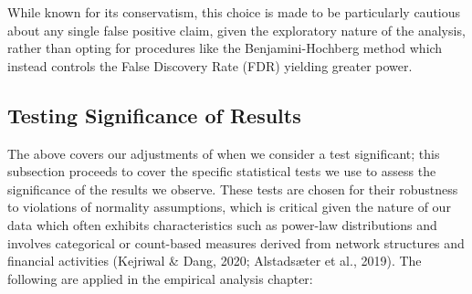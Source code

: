 While known for its conservatism, this choice is made to be particularly cautious about any single false positive claim, given the exploratory nature of the analysis, rather than opting for procedures like the Benjamini-Hochberg method which instead controls the False Discovery Rate (FDR) yielding greater power.

\subsection{Testing Significance of Results}
\label{subsec:significance_testing}

The above covers our adjustments of when we consider a test significant; this subsection proceeds to cover the specific statistical tests we use to assess the significance of the results we observe. These tests are chosen for their robustness to violations of normality assumptions, which is critical given the nature of our data which often exhibits characteristics such as power-law distributions and involves categorical or count-based measures derived from network structures and financial activities (Kejriwal \& Dang, 2020; Alstadsæter et al., 2019). The following are applied in the empirical analysis chapter:
